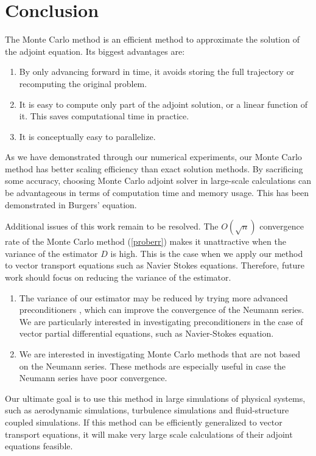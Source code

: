 \section{Conclusion}
    The Monte Carlo method is an efficient method to approximate the solution
    of the adjoint equation. Its biggest advantages are:
    \begin{enumerate}
        \item By only advancing forward in time, it avoids storing the full
              trajectory or recomputing the original problem.
        \item It is easy to compute only part of the adjoint solution, or a
              linear function of it. This saves computational time
              in practice.
        \item It is conceptually easy to parallelize.
    \end{enumerate}
    As we have demonstrated through our numerical experiments, our Monte
    Carlo method has better scaling efficiency than exact solution methods.
    By sacrificing some accuracy, choosing Monte Carlo adjoint solver in
    large-scale calculations can be advantageous in terms of computation time
    and memory usage.  This has been demonstrated in Burgers' equation.

    Additional issues of this work remain to be resolved.
    The $O(\sqrt{n})$ convergence rate of the Monte Carlo method
    (\ref{proberr}) makes it unattractive when the variance of the estimator
    $D$ is high.  This is the case when we apply our method to vector
    transport equations such as Navier Stokes equations.  Therefore,
    future work should focus on reducing the variance of the estimator.
    \begin{enumerate}
    \item The variance of our estimator may be reduced by trying more
          advanced preconditioners \cite[]{Tan2002} \cite[]{Srinivasan2003},
          which can improve the convergence of the Neumann series.  We are 
          particularly
          interested in investigating preconditioners in the case of vector
          partial differential equations, such as Navier-Stokes equation.
    \item We are interested in investigating Monte Carlo methods that are not
          based on the Neumann series.  These methods are especially useful
          in case the Neumann series have poor convergence.
    \end{enumerate}
    Our ultimate goal is to use this method in large simulations of physical
    systems, such as aerodynamic simulations, turbulence simulations and
    fluid-structure coupled simulations.
    If this method can be efficiently generalized to vector transport
    equations, it will make very large scale calculations of their adjoint
    equations feasible.

